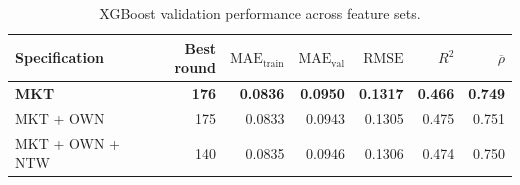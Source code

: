\begin{table}[!htbp]
\centering
\footnotesize
\setlength{\tabcolsep}{4pt}
\caption{XGBoost validation performance across feature sets.}
\label{tab:xgboost-feature-set-validation}
\begin{tabular}{lrrrrrr}
\toprule
Specification & Best round & $\mathrm{MAE}_{\mathrm{train}}$ & $\mathrm{MAE}_{\mathrm{val}}$ & $\mathrm{RMSE}$ & $R^2$ & $\overline{\rho}$ \\
\midrule
\textbf{MKT} & \textbf{176} & \textbf{0.0836} & \textbf{0.0950} & \textbf{0.1317} & \textbf{0.466} & \textbf{0.749} \\
MKT + OWN & 175 & 0.0833 & 0.0943 & 0.1305 & 0.475 & 0.751 \\
MKT + OWN + NTW & 140 & 0.0835 & 0.0946 & 0.1306 & 0.474 & 0.750 \\
\bottomrule
\end{tabular}
\end{table}
